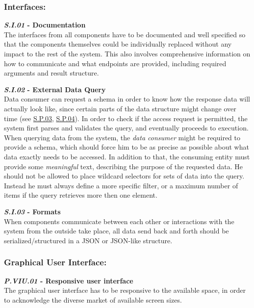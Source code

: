 \documentclass[12pt,english,a4paper,titlepage,cleardoublepage=empty,dottedtoc]{report}
\begin{document}
\subsubsection*{Interfaces:}\label{interfaces}

\textbf{\emph{\protect\hypertarget{si01}{}{S.I.01}} - Documentation}\\
The interfaces from all components have to be documented and well
specified so that the components themselves could be individually
replaced without any impact to the rest of the system. This also
involves comprehensive information on how to communicate and what
endpoints are provided, including required arguments and result
structure.

\textbf{\emph{\protect\hypertarget{si02}{}{S.I.02}} - External Data
Query}\\
Data consumer can request a schema in order to know how the response
data will actually look like, since certain parts of the data structure
might change over time (see \protect\hyperlink{sp03}{S.P.03},
\protect\hyperlink{sp04}{S.P.04}). In order to check if the access
request is permitted, the system first parses and validates the query,
and eventually proceeds to execution. When querying data from the
system, the \emph{data consumer} might be required to provide a schema,
which should force him to be as precise as possible about what data
exactly needs to be accessed. In addition to that, the consuming entity
must provide some \emph{meaningful} text, describing the purpose of the
requested data. He should not be allowed to place wildcard selectors for
sets of data into the query. Instead he must always define a more
specific filter, or a maximum number of items if the query retrieves
more then one element.

\textbf{\emph{\protect\hypertarget{si03}{}{S.I.03}} - Formats}\\
When components communicate between each other or interactions with the
system from the outside take place, all data send back and forth should
be serialized/structured in a JSON or JSON-like structure.

\subsubsection*{Graphical User
Interface:}\label{graphical-user-interface}

\textbf{\emph{\protect\hypertarget{pviu01}{}{P.VIU.01}} - Responsive
user interface}\\
The graphical user interface has to be responsive to the available
space, in order to acknowledge the diverse market of available screen
sizes.
\end{document}
